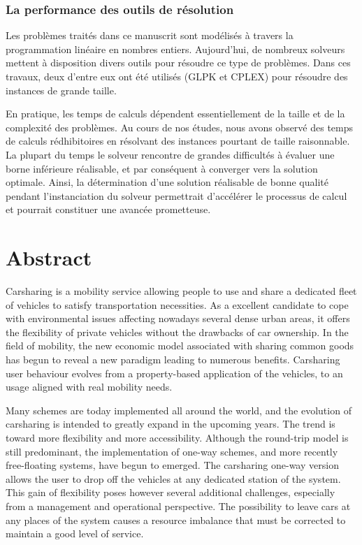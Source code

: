 \subsection*{La performance des outils de résolution}
Les problèmes traités dans ce manuscrit sont modélisés à travers la programmation linéaire en nombres entiers.
Aujourd'hui, de nombreux solveurs mettent à disposition divers outils pour résoudre ce type de problèmes.
Dans ces travaux, deux d'entre eux ont été utilisés (GLPK et CPLEX) pour résoudre des instances de grande taille.

\medskip
En pratique, les temps de calculs dépendent essentiellement de la taille et de la complexité des problèmes.
Au cours de nos études, nous avons observé des temps de calculs rédhibitoires en résolvant des instances pourtant de taille raisonnable.
La plupart du temps le solveur rencontre de grandes difficultés à évaluer une borne inférieure réalisable, et par conséquent à converger vers la solution optimale.
Ainsi, la détermination d'une solution réalisable de bonne qualité pendant l'instanciation du solveur permettrait d'accélérer le processus de calcul et pourrait constituer une avancée prometteuse.


\newpage
\chapter*{Abstract}
Carsharing is a mobility service allowing people to use and share a dedicated fleet of vehicles to satisfy transportation necessities.
As a excellent candidate to cope with environmental issues affecting nowadays several dense urban areas, it offers the flexibility of private vehicles without the drawbacks of car ownership.
In the field of mobility, the new economic model associated with sharing common goods has begun to reveal a new paradigm leading to numerous benefits.
Carsharing user behaviour evolves from a property-based application of the vehicles, to an usage aligned with real mobility needs.

\medskip
Many schemes are today implemented all around the world, and the evolution of carsharing is intended to greatly expand in the upcoming years.
The trend is toward more flexibility and more accessibility.
Although the round-trip model is still predominant, the implementation of one-way schemes, and more recently free-floating systems, have begun to emerged.
The carsharing one-way version allows the user to drop off the vehicles at any dedicated station of the system.
This gain of flexibility poses however several additional challenges, especially from a management and operational perspective.
The possibility to leave cars at any places of the system causes a resource imbalance that must be corrected to maintain a good level of service.

